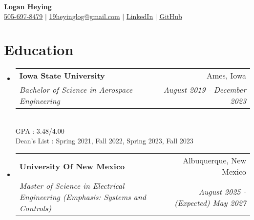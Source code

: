 \documentclass[letterpaper, 10pt]{article}
\makeatletter
\newcommand{\resumeSubheading}[4]
{
    \vspace{-2pt}\item
    \begin{tabular*}{0.97\textwidth}[t]{l@{\extracolsep{\fill}}r}
        \textbf{#1} & \small #2 \\ \vspace{-2pt}
        \textit{\small#3} & \textit{\small #4} \\
    \end{tabular*}\vspace{-2pt}
}
\newcommand{\resumeSubHeadingListStart}{\begin{itemize}[leftmargin=0.15in, label={}]}
\newcommand{\resumeSubHeadingListEnd}{\end{itemize}}
\makeatother
\begin{document}
    \begin{center}
        
        \textbf{\large Logan Heying} \\ \vspace{-1pt}
        \href{tel:5056978479}{\footnotesize 505-697-8479} $|$ 
        \href{mailto:19heyinglog@gmail.com}{\footnotesize\underline{19heyinglog@gmail.com}} $|$ 
        \href{https://linkedin.com/in/loganheying}{\footnotesize\underline{LinkedIn}} $|$ 
        \href{https://github.com/MidwestGames}{\footnotesize\underline{GitHub}} %

    \end{center}

    \section{Education}
        \resumeSubHeadingListStart
            \resumeSubheading
                {Iowa State University}{Ames, Iowa}
                {Bachelor of Science in Aerospace Engineering} {August 2019 - December 2023} \\ \vspace{2pt}
                \hspace*{10pt} {\footnotesize GPA : 3.48/4.00} \\ \vspace{-3pt}
                \hspace*{10pt} {\footnotesize Dean's List : Spring 2021, Fall 2022, Spring 2023, Fall 2023} \vspace{-3pt}
            \resumeSubheading
                {University Of New Mexico}{Albuquerque, New Mexico}
                {Master of Science in Electrical Engineering (Emphasis: Systems and Controls)} {August 2025 - (Expected) May 2027}
        \resumeSubHeadingListEnd

\end{document}

